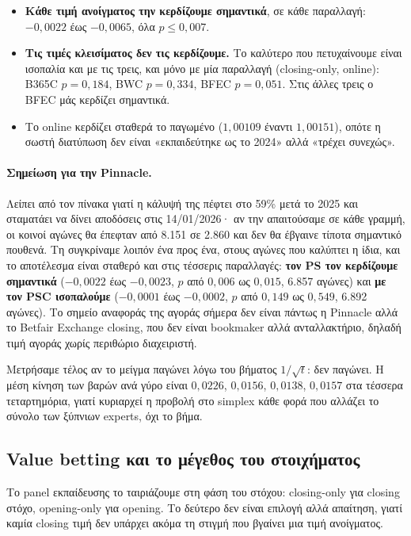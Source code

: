 \documentclass[11pt,a4paper]{article}
\renewcommand{\_}{\oldunderscore\allowbreak}
\begin{document}
\begin{itemize}
  \item \textbf{Κάθε τιμή ανοίγματος την κερδίζουμε σημαντικά}, σε κάθε παραλλαγή:
        $-0{,}0022$ έως $-0{,}0065$, όλα $p\leq0{,}007$.
  \item \textbf{Τις τιμές κλεισίματος δεν τις κερδίζουμε.} Το καλύτερο που πετυχαίνουμε
        είναι ισοπαλία και με τις τρεις, και μόνο με μία παραλλαγή (closing-only, online):
        B365C $p=0{,}184$, BWC $p=0{,}334$, BFEC $p=0{,}051$. Στις άλλες τρεις ο BFEC μάς
        κερδίζει σημαντικά.
  \item Το online κερδίζει σταθερά το παγωμένο ($1{,}00109$ έναντι $1{,}00151$), οπότε η
        σωστή διατύπωση δεν είναι «εκπαιδεύτηκε ως το 2024» αλλά «τρέχει συνεχώς».
\end{itemize}

\paragraph{Σημείωση για την Pinnacle.} Λείπει από τον πίνακα γιατί η κάλυψή της πέφτει στο
59\% μετά το 2025 και σταματάει να δίνει αποδόσεις στις 14/01/2026· αν την απαιτούσαμε σε
κάθε γραμμή, οι κοινοί αγώνες θα έπεφταν από 8.151 σε 2.860 και δεν θα έβγαινε τίποτα
σημαντικό πουθενά. Τη συγκρίναμε λοιπόν ένα προς ένα, στους αγώνες που καλύπτει η ίδια, και
το αποτέλεσμα είναι σταθερό και στις τέσσερις παραλλαγές: \textbf{τον PS τον κερδίζουμε
σημαντικά} ($-0{,}0022$ έως $-0{,}0023$, $p$ από $0{,}006$ ως $0{,}015$, 6.857 αγώνες) και
\textbf{με τον PSC ισοπαλούμε} ($-0{,}0001$ έως $-0{,}0002$, $p$ από $0{,}149$ ως $0{,}549$,
6.892 αγώνες). Το σημείο αναφοράς της αγοράς σήμερα δεν είναι πάντως η Pinnacle αλλά το
Betfair Exchange closing, που δεν είναι bookmaker αλλά ανταλλακτήριο, δηλαδή τιμή αγοράς
χωρίς περιθώριο διαχειριστή.

Μετρήσαμε τέλος αν το μείγμα παγώνει λόγω του βήματος $1/\sqrt{t}$: δεν παγώνει. Η μέση
κίνηση των βαρών ανά γύρο είναι $0{,}0226$, $0{,}0156$, $0{,}0138$, $0{,}0157$ στα τέσσερα
τεταρτημόρια, γιατί κυριαρχεί η προβολή στο simplex κάθε φορά που αλλάζει το σύνολο των
ξύπνιων experts, όχι το βήμα.

\subsection*{Value betting και το μέγεθος του στοιχήματος}

Το panel εκπαίδευσης το ταιριάζουμε στη φάση του στόχου: closing-only για closing στόχο,
opening-only για opening. Το δεύτερο δεν είναι επιλογή αλλά απαίτηση, γιατί καμία closing
τιμή δεν υπάρχει ακόμα τη στιγμή που βγαίνει μια τιμή ανοίγματος.
\end{document}
